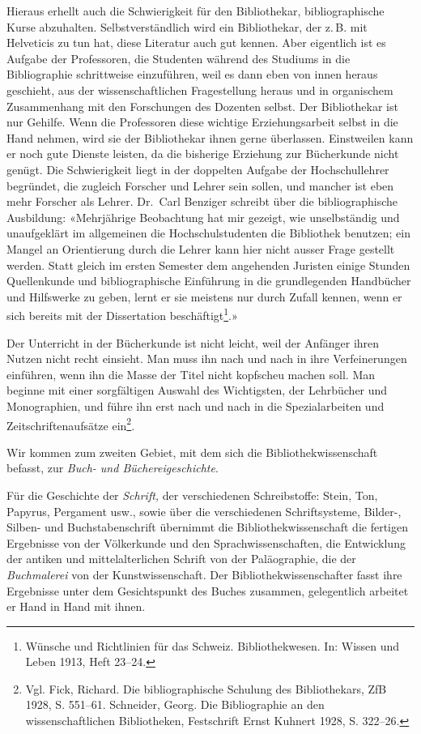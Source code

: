 \documentclass[a4paper,
fontsize=11pt,
oneside,
numbers=noperiodatend,
parskip=half-,
bibliography=totoc,
final
]{scrartcl}
\begin{document}
Hieraus erhellt auch die Schwierigkeit für den Bibliothekar,
bibliographische Kurse abzuhalten. Selbstverständlich wird ein
Bibliothekar, der z.\,B. mit Helveticis zu tun hat, diese Literatur auch
gut kennen. Aber eigentlich ist es Aufgabe der Professoren, die
Studenten während des Studiums in die Bibliographie schrittweise
einzuführen, weil es dann eben von innen heraus geschieht, aus der
wissenschaftlichen Fragestellung heraus und in organischem Zusammenhang
mit den Forschungen des Dozenten selbst. Der Bibliothekar ist nur
Gehilfe. Wenn die Professoren diese wichtige Erziehungsarbeit selbst in
die Hand nehmen, wird sie der Bibliothekar ihnen gerne überlassen.
Einstweilen kann er noch gute Dienste leisten, da die bisherige
Erziehung zur Bücherkunde nicht genügt. Die Schwierigkeit liegt in der
doppelten Aufgabe der Hochschullehrer begründet, die zugleich Forscher
und Lehrer sein sollen, und mancher ist eben mehr Forscher als Lehrer.
Dr.~Carl Benziger schreibt über die bibliographische Ausbildung:
«Mehrjährige Beobachtung hat mir gezeigt, wie unselbständig und
unaufgeklärt im allgemeinen die Hochschulstudenten die Bibliothek
benutzen; ein Mangel an Orientierung durch die Lehrer kann hier nicht
ausser Frage gestellt werden. Statt gleich im ersten Semester dem
angehenden Juristen einige Stunden Quellenkunde und bibliographische
Einführung in die grundlegenden Handbücher und Hilfswerke zu geben,
lernt er sie meistens nur durch Zufall kennen, wenn er sich bereits mit
der Dissertation beschäftigt\footnote{Wünsche und Richtlinien für das
  Schweiz. Bibliothekwesen. In: Wissen und Leben 1913, Heft 23--24.}.»

Der Unterricht in der Bücherkunde ist nicht leicht, weil der Anfänger
ihren Nutzen nicht recht einsieht. Man muss ihn nach und nach in ihre
Verfeinerungen einführen, wenn ihn die Masse der Titel nicht kopfscheu
machen soll. Man beginne mit einer sorgfältigen Auswahl des Wichtigsten,
der Lehrbücher und Monographien, und führe ihn erst nach und nach in die
Spezialarbeiten und Zeitschriftenaufsätze ein\footnote{Vgl. Fick,
  Richard. Die bibliographische Schulung des Bibliothekars, ZfB 1928, S.
  551--61. Schneider, Georg. Die Bibliographie an den wissenschaftlichen
  Bibliotheken, Festschrift Ernst Kuhnert 1928, S. 322--26.}.

Wir kommen zum zweiten Gebiet, mit dem sich die Bibliothekwissenschaft
befasst, zur \emph{Buch- und Büchereigeschichte}.

Für die Geschichte der \emph{Schrift,} der verschiedenen Schreibstoffe:
Stein, Ton, Papyrus, Pergament usw., sowie über die verschiedenen
Schriftsysteme, Bilder-, Silben- und Buchstabenschrift übernimmt die
Bibliothekwissenschaft die fertigen Ergebnisse von der Völkerkunde und
den Sprachwissenschaften, die Entwicklung der antiken und
mittelalterlichen Schrift von der Paläographie, die der
\emph{Buchmalerei} von der Kunstwissenschaft. Der
Bibliothekwissenschafter fasst ihre Ergebnisse unter dem Gesichtspunkt
des Buches zusammen, gelegentlich arbeitet er Hand in Hand mit ihnen.
\end{document}
